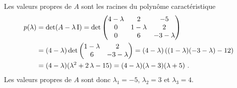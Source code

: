{ Les valeurs propres de $A$ sont les racines du polynôme
caractéristique
\begin{align*}
p(\lambda) &= \det(A -\lambda \operatorname{I})
=\det \begin{pmatrix}
4-\lambda & 2 & -5 \\ 0 & 1-\lambda & 2 \\ 0 & 6 & -3-\lambda
\end{pmatrix} \\
&=(4-\lambda) \det \begin{pmatrix} 1-\lambda & 2 \\  6 & -3-\lambda
\end{pmatrix}
=(4-\lambda)\left( (1-\lambda)(-3-\lambda)-12\right) \\
&= (4-\lambda)(\lambda^2 +2\,\lambda -15 )
= (4-\lambda)(\lambda -3)(\lambda +5) \ .
\end{align*}
Les valeurs propres de $A$ sont donc $\lambda_1 = -5$, $\lambda_2 = 3$
et $\lambda_3 = 4$.

}
